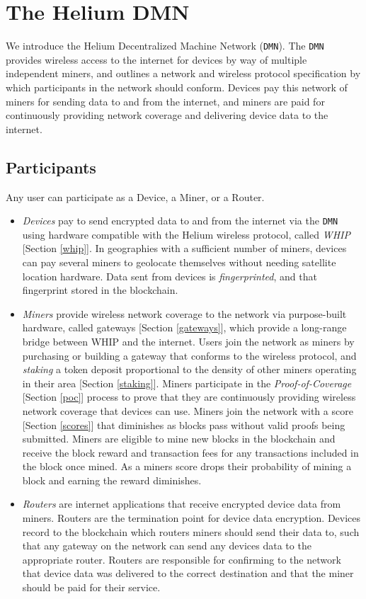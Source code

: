 \documentclass[10pt, nonatbib, nocopyrightspace, reprint]{sigplanconf}
\begin{document}
\section{The Helium DMN}

We introduce the Helium Decentralized Machine Network (\verb|DMN|). The \verb|DMN| provides wireless access to the internet for devices by way of multiple independent miners, and outlines a network and wireless protocol specification by which participants in the network should conform. Devices pay this network of miners for sending data to and from the internet, and miners are paid for continuously providing network coverage and delivering device data to the internet.

\subsection{Participants}

Any user can participate as a Device, a Miner, or a Router.

\begin{itemize}
    \item \emph{Devices} pay to send encrypted data to and from the internet via the \verb|DMN| using hardware compatible with the Helium wireless protocol, called \emph{WHIP} [Section \ref{whip}]. In geographies with a sufficient number of miners, devices can pay several miners to geolocate themselves without needing satellite location hardware. Data sent from devices is \emph{fingerprinted}, and that fingerprint stored in the blockchain.
    \item \emph{Miners} provide wireless network coverage to the network via purpose-built hardware, called gateways [Section \ref{gateways}], which provide a long-range bridge between WHIP and the internet. Users join the network as miners by purchasing or building a gateway that conforms to the wireless protocol, and \emph{staking} a token deposit proportional to the density of other miners operating in their area [Section \ref{staking}]. Miners participate in the \emph{Proof-of-Coverage} [Section \ref{poc}] process to prove that they are continuously providing wireless network coverage that devices can use. Miners join the network with a score [Section \ref{scores}] that diminishes as blocks pass without valid proofs being submitted. Miners are eligible to mine new blocks in the blockchain and receive the block reward and transaction fees for any transactions included in the block once mined. As a miners score drops their probability of mining a block and earning the reward diminishes.
    \item \emph{Routers} are internet applications that receive encrypted device data from miners. Routers are the termination point for device data encryption. Devices record to the blockchain which routers miners should send their data to, such that any gateway on the network can send any devices data to the appropriate router. Routers are responsible for confirming to the network that device data was delivered to the correct destination and that the miner should be paid for their service.
\end{itemize}
\end{document}
